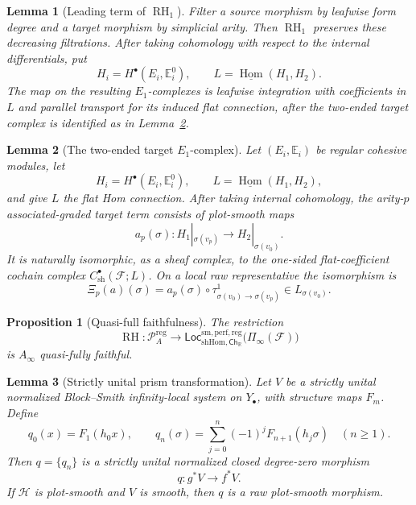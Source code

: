 \documentclass[10pt,a4paper]{amsart}
\newtheorem{lem}{Lemma}
\newtheorem{prop}{Proposition}
\newcommand{\A}{{A}}
\newcommand{\CF}{{\mathcal F}}
\newcommand{\Ch}{\mathsf{Ch}}
\newcommand{\Hom}{\operatorname{Hom}}
\newcommand{\Loc}{\mathsf{Loc}}
\newcommand{\R}{{\mathbb{R}}}
\newcommand{\RH}{\operatorname{RH}}
\begin{document}
\begin{lem}[Leading term of $\RH_1$]\label{lem:rh-leading}
Filter a source morphism by leafwise form degree and a target morphism
by simplicial arity.  Then $\RH_1$ preserves these decreasing
filtrations.  After taking cohomology with respect to the internal
differentials, put
\[
 H_i=H^\bullet(E_i,\mathbb E_i^0),
 \qquad
 L=\underline{\operatorname{Hom}}(H_1,H_2).
\]
The map on the resulting $E_1$-complexes is leafwise integration with
coefficients in $L$ and parallel transport for its induced flat
connection, after the two-ended target complex is identified as in
Lemma~\ref{lem:target-e1}.
\end{lem}

\begin{lem}[The two-ended target $E_1$-complex]
\label{lem:target-e1}
Let $(E_i,\mathbb E_i)$ be regular cohesive modules, let
\[
 H_i=H^\bullet(E_i,\mathbb E_i^0),
 \qquad
 L=\underline{\Hom}(H_1,H_2),
\]
and give $L$ the flat Hom connection.  After taking internal
cohomology, the arity-$p$ associated-graded target term consists of
plot-smooth maps
\[
 a_p(\sigma):
 H_1|_{\sigma(v_p)}
 \longrightarrow
 H_2|_{\sigma(v_0)}.
\]
It is naturally isomorphic, as a sheaf complex, to the one-sided
flat-coefficient cochain complex
$C^\bullet_{\mathrm{sh}}(\CF;L)$.  On a local raw representative the
isomorphism is
\begin{equation}\label{eq:two-ended-xi}
 \Xi_p(a)(\sigma)
 =
 a_p(\sigma)\circ
 \tau^1_{\sigma(v_0)\to\sigma(v_p)}
 \in L_{\sigma(v_0)}.
\end{equation}
\end{lem}

\begin{prop}[Quasi-full faithfulness]\label{prop:qff}
The restriction
\[
 \RH:\mathcal P_{\A}^{\mathrm{reg}}
 \longrightarrow
 \Loc_{\mathrm{shHom},\Ch_{\R}}^{\mathrm{sm,perf,reg}}
 \bigl(\Pi_{\infty}(\CF)\bigr)
\]
is $A_{\infty}$ quasi-fully faithful.
\end{prop}

\begin{lem}[Strictly unital prism transformation]
\label{lem:prism-transformation}
Let $V$ be a strictly unital normalized Block--Smith
infinity-local system on $Y_\bullet$, with structure maps $F_m$.
Define
\begin{equation}\label{eq:unital-prism-components}
 q_0(x)=F_1(h_0x),
 \qquad
 q_n(\sigma)=
 \sum_{j=0}^n(-1)^jF_{n+1}(h_j\sigma)
 \quad(n\geq1).
\end{equation}
Then $q=\{q_n\}$ is a strictly unital normalized closed degree-zero
morphism
\[
 q:g^*V\longrightarrow f^*V.
\]
If $\mathcal H$ is plot-smooth and $V$ is smooth, then $q$ is a raw
plot-smooth morphism.
\end{lem}
\end{document}
